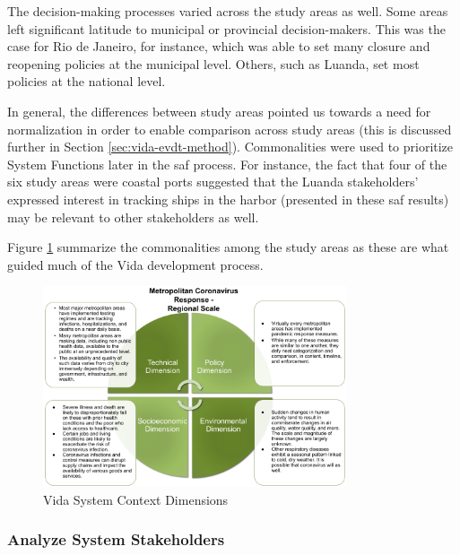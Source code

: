 The decision-making processes varied across the study areas as well. Some areas left significant latitude to municipal or provincial decision-makers. This was the case for Rio de Janeiro, for instance, which was able to set many closure and reopening policies at the municipal level. Others, such as Luanda, set most policies at the national level. 

In general, the differences between study areas pointed us towards a need for normalization in order to enable comparison across study areas (this is discussed further in Section \ref{sec:vida-evdt-method}). Commonalities were used to prioritize System Functions later in the \ac{saf} process. For instance, the fact that four of the six study areas were coastal ports suggested that the Luanda stakeholders' expressed interest in tracking ships in the harbor (presented in these \ac{saf} results) may be relevant to other stakeholders as well.

Figure \ref{fig:dimensions_vida} summarize the commonalities among the study areas as these are what guided much of the Vida development process.

\begin{figure}[!htb] 
\centering
\includegraphics[width=0.8\textwidth]{Figures/chap5/dimensions_vida.png}
\caption[Vida System Context Dimensions]{Vida System Context Dimensions}
\label{fig:dimensions_vida}
\end{figure}


\subsubsection{Analyze System Stakeholders} \label{sec:vida-saf-stakeholders-result}

